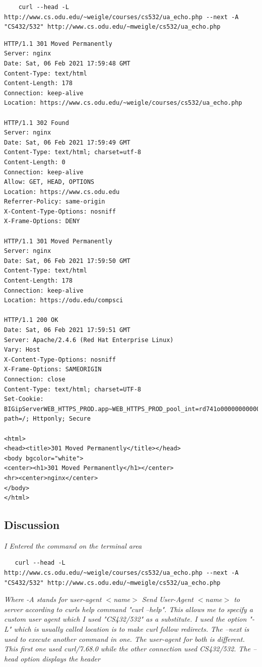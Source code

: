 \documentclass[12pt]{article}
\begin{document}
\begin{lstlisting}
    curl --head -L http://www.cs.odu.edu/~weigle/courses/cs532/ua_echo.php --next -A "CS432/532" http://www.cs.odu.edu/~mweigle/cs532/ua_echo.php
\end{lstlisting}
\begin{lstlisting}
HTTP/1.1 301 Moved Permanently
Server: nginx
Date: Sat, 06 Feb 2021 17:59:48 GMT
Content-Type: text/html
Content-Length: 178
Connection: keep-alive
Location: https://www.cs.odu.edu/~weigle/courses/cs532/ua_echo.php

HTTP/1.1 302 Found
Server: nginx
Date: Sat, 06 Feb 2021 17:59:49 GMT
Content-Type: text/html; charset=utf-8
Content-Length: 0
Connection: keep-alive
Allow: GET, HEAD, OPTIONS
Location: https://www.cs.odu.edu
Referrer-Policy: same-origin
X-Content-Type-Options: nosniff
X-Frame-Options: DENY

HTTP/1.1 301 Moved Permanently
Server: nginx
Date: Sat, 06 Feb 2021 17:59:50 GMT
Content-Type: text/html
Content-Length: 178
Connection: keep-alive
Location: https://odu.edu/compsci

HTTP/1.1 200 OK
Date: Sat, 06 Feb 2021 17:59:51 GMT
Server: Apache/2.4.6 (Red Hat Enterprise Linux)
Vary: Host
X-Content-Type-Options: nosniff
X-Frame-Options: SAMEORIGIN
Connection: close
Content-Type: text/html; charset=UTF-8
Set-Cookie: BIGipServerWEB_HTTPS_PROD.app~WEB_HTTPS_PROD_pool_int=rd741o00000000000000000000ffff8052619eo80; path=/; Httponly; Secure

<html>
<head><title>301 Moved Permanently</title></head>
<body bgcolor="white">
<center><h1>301 Moved Permanently</h1></center>
<hr><center>nginx</center>
</body>
</html>
\end{lstlisting}
\subsection*{Discussion}
\emph{I Entered the command on the terminal area}
\begin{lstlisting}
   curl --head -L http://www.cs.odu.edu/~weigle/courses/cs532/ua_echo.php --next -A "CS432/532" http://www.cs.odu.edu/~mweigle/cs532/ua_echo.php
\end{lstlisting}
\emph{Where -A stands for user-agent $<$name$>$ Send User-Agent $<$name$>$ to server according to curls help command "curl --help". This allows me to specify a custom user agent which I used "CS432/532" as a  substitute. I used the option "-L" which is usually called location is to make curl follow redirects. The --next is used to execute another command in one. The user-agent for both is different. This first one used curl/7.68.0 while the other connection used CS432/532. The --head option displays the header}
\end{document}
